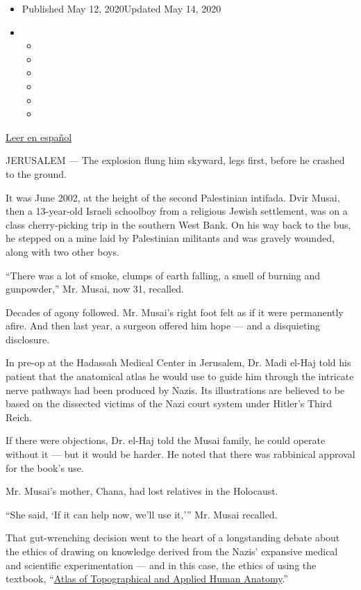 \begin{itemize}
\item
  Published May 12, 2020Updated May 14, 2020
\item
  \begin{itemize}
  \item
  \item
  \item
  \item
  \item
  \item
  \end{itemize}
\end{itemize}

\href{https://www.nytimes.com/es/2020/05/15/espanol/mundo/libro-nazi-israel-medicina.html}{Leer
en español}

JERUSALEM --- The explosion flung him skyward, legs first, before he
crashed to the ground.

It was June 2002, at the height of the second Palestinian intifada. Dvir
Musai, then a 13-year-old Israeli schoolboy from a religious Jewish
settlement, was on a class cherry-picking trip in the southern West
Bank. On his way back to the bus, he stepped on a mine laid by
Palestinian militants and was gravely wounded, along with two other
boys.

``There was a lot of smoke, clumps of earth falling, a smell of burning
and gunpowder,'' Mr. Musai, now 31, recalled.

Decades of agony followed. Mr. Musai's right foot felt as if it were
permanently afire. And then last year, a surgeon offered him hope ---
and a disquieting disclosure.

In pre-op at the Hadassah Medical Center in Jerusalem, Dr. Madi el-Haj
told his patient that the anatomical atlas he would use to guide him
through the intricate nerve pathways had been produced by Nazis. Its
illustrations are believed to be based on the dissected victims of the
Nazi court system under Hitler's Third Reich.

If there were objections, Dr. el-Haj told the Musai family, he could
operate without it --- but it would be harder. He noted that there was
rabbinical approval for the book's use.

Mr. Musai's mother, Chana, had lost relatives in the Holocaust.

``She said, `If it can help now, we'll use it,''' Mr. Musai recalled.

That gut-wrenching decision went to the heart of a longstanding debate
about the ethics of drawing on knowledge derived from the Nazis'
expansive medical and scientific experimentation --- and in this case,
the ethics of using the textbook,
``\href{https://www.nytimes.com/1996/11/26/science/doctors-question-use-of-nazi-s-medical-atlas.html}{Atlas
of Topographical and Applied Human Anatomy}.''

